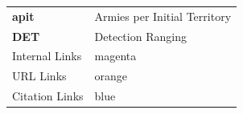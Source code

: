 \begin{tabular}{ l l }
 \textbf{apit} & Armies per Initial Territory \\
 \textbf{DET} & Detection Ranging \\
\hline
Internal Links & magenta\\
URL Links & orange \\
Citation Links & blue \\
\end{tabular}